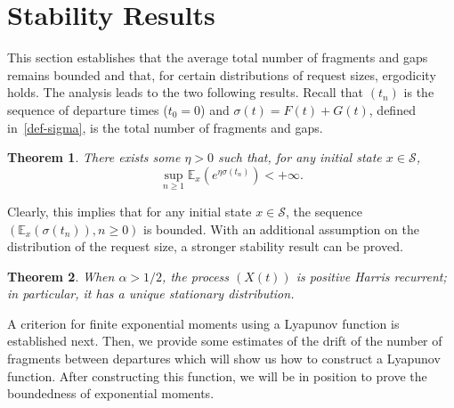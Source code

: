 \documentclass{amsart}
\def\E{\mathbb{E}}
\def\Scal{\mathcal{S}}
\newtheorem{theorem}{Theorem}
\begin{document}
\section{Stability Results} \label{sec:stab}
This section  establishes that the average total number of fragments
and gaps remains bounded and that, for certain distributions of
request sizes, ergodicity holds. The analysis leads to the
two following results. Recall that $(t_n)$ is the sequence of
departure times ($t_0 = 0$) and $\sigma(t) = F(t)+G(t)$, defined
in~\eqref{def-sigma}, is the total number of fragments and gaps.
\begin{theorem} \label{thm:sup}
There exists some $\eta>0$ such that, for any initial state $x \in \Scal$,
 \begin{equation} \label{eq:sup-n}
    \sup_{n \geq 1} \E_x \left( e^{\eta \sigma(t_n)} \right) < +\infty.
    \end{equation}
\end{theorem}
Clearly, this implies that for any initial state $x \in \Scal$, the
sequence $(\E_x(\sigma(t_n)), n \geq 0)$ is bounded. With an
additional assumption on the distribution of the request size, a stronger stability result can be proved.
\begin{theorem} \label{thm:stab}
When $\alpha  > 1/2$, the process $(X(t))$ is positive Harris
recurrent; in particular, it has a unique stationary distribution.
\end{theorem}
A criterion for finite exponential moments using a Lyapunov function
is established next.  Then, we provide  some estimates of the drift
of the number of fragments between departures which will show us how
to construct a Lyapunov function.  After constructing this function,
we will be in position to prove  the boundedness of exponential
moments.
\end{document}
